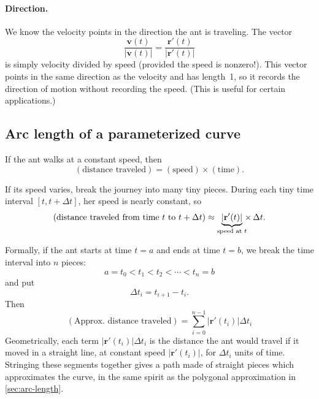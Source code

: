 \documentclass[10pt]{article}
\theoremstyle{definition}
\newcommand{\1}[1]{\textbf{1}_{\left[#1\right]}} %
\begin{document}
\paragraph{Direction.}
We know the velocity points in the direction the ant is traveling. The vector
\begin{equation*}
  \frac{\mathbf{v}(t)}{|\mathbf{v}(t)|}=\frac{\mathbf{r}'(t)}{|\mathbf{r}'(t)|}
\end{equation*}
is simply velocity divided by speed (provided the speed is nonzero!). This
vector points in the same direction as the velocity and has length~1, so it
records the direction of motion without recording the speed. (This is useful
for certain applications.)

\subsection{Arc length of a parameterized curve}

If the ant walks at a constant speed, then
\begin{equation*}
  (\text{distance traveled})=(\text{speed})\times(\text{time}).
\end{equation*}

If its speed varies, break the journey into many tiny pieces. During each
tiny time interval $[t, t+\Delta t]$, her speed is nearly constant, so
\begin{equation*}
  (\text{distance traveled from time $t$ to $t+\Delta t$})
  \approx \underbrace{ |\mathbf{r}'(t)|}_{\text{speed at
      $t$}} \hspace{-.4em}\times\, \Delta t.
\end{equation*}

Formally, if the ant starts at time $t=a$ and ends at time $t=b$, we break
the time interval into $n$ pieces:
\begin{equation*}
  a=t_{0}<t_{1}<t_{2}<\cdots <t_{n} = b
\end{equation*}
and put
\begin{equation*}
  \Delta t_{i} = t_{i+1}-t_{i}.
\end{equation*}
Then
\begin{equation*}
  (\text{Approx.~distance traveled})= \sum_{i=0}^{n-1} |\mathbf{r}'(t_{i})|\Delta t_{i}
\end{equation*}
Geometrically, each term $|\mathbf{r}'(t_{i})|\Delta t_{i}$ is the distance
the ant would travel if it moved in a straight line, at constant speed
$|\mathbf{r}'(t_{i})|$, for $\Delta t_{i}$ units of time. Stringing these
segments together gives a path made of straight pieces which approximates
the curve, in the same spirit as the polygonal approximation in
\cref{sec:arc-length}.
\end{document}
